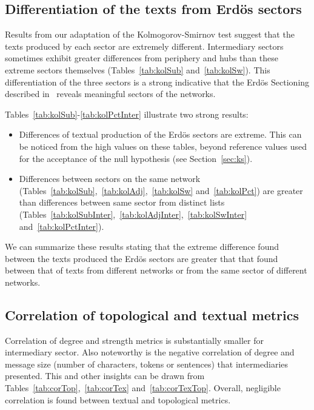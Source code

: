 \documentclass[%
 aip,
 jmp,%
 amsmath,amssymb,
 reprint,%
]{revtex4-1}
\begin{document}
\subsection{Differentiation of the texts from Erd\"os sectors}\label{subsec:di}







Results from our adaptation of the Kolmogorov-Smirnov test
suggest that the texts produced by each sector are extremely different.
Intermediary sectors sometimes exhibit greater differences 
from periphery and hubs than these extreme sectors themselves 
(Tables~\ref{tab:kolSub} and~\ref{tab:kolSw}).
This differentiation of the three sectors is a
strong indicative that the Erd\"os Sectioning
described in~\cite{evoSN} reveals meaningful
sectors of the networks.

Tables~\ref{tab:kolSub}-\ref{tab:kolPctInter}
illustrate two strong results:
\begin{itemize}
    \item Differences of textual production of the Erd\"os sectors are extreme.
	    This can be noticed from the high values on these tables,
	    beyond reference values used for the acceptance of the 
	    null hypothesis (see Section~\ref{sec:ks}).
    \item Differences between sectors on the same network 
	    (Tables~\ref{tab:kolSub},~\ref{tab:kolAdj},~\ref{tab:kolSw} and~\ref{tab:kolPct}) are greater than differences between same sector from distinct lists (Tables~\ref{tab:kolSubInter},~\ref{tab:kolAdjInter},~\ref{tab:kolSwInter} and~\ref{tab:kolPctInter}).
\end{itemize}

We can summarize these results stating that the extreme difference
found between the texts produced the Erd\"os sectors
are greater that that found between that of texts from different
networks or from the same sector of different networks.

\subsection{Correlation of topological and textual metrics}\label{subsec:cor}

Correlation of degree 
and strength metrics is
substantially smaller for intermediary sector.
Also noteworthy is the negative correlation of degree and message size (number of characters, tokens or sentences) that intermediaries presented.
This and other insights can be drawn from Tables~\ref{tab:corTop},~\ref{tab:corTex} and~\ref{tab:corTexTop}.
Overall, negligible correlation is found between textual and topological metrics.
\end{document}
